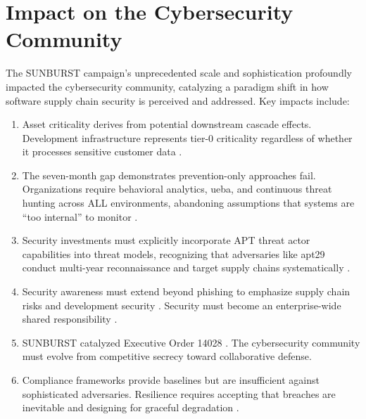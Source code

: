 \section{Impact on the Cybersecurity Community}

The SUNBURST campaign's unprecedented scale and sophistication profoundly impacted the cybersecurity community, catalyzing a paradigm shift in how software supply chain security is perceived and addressed. Key impacts include:

\begin{enumerate}
    \item {} Asset criticality derives from potential downstream cascade effects. Development infrastructure represents tier-0 criticality regardless of whether it processes sensitive customer data \cite{boyens2024}.
    \item {} The seven-month gap demonstrates prevention-only approaches fail. Organizations require behavioral analytics, \gls{ueba}, and continuous threat hunting across ALL environments, abandoning assumptions that systems are ``too internal'' to monitor \cite{nelson2025}.
    \item {} Security investments must explicitly incorporate APT threat actor capabilities into threat models, recognizing that adversaries like \gls{apt}29 conduct multi-year reconnaissance and target supply chains systematically \cite{mitre2025a}.
    \item {} Security awareness must extend beyond phishing to emphasize supply chain risks and development security \cite{boyens2024}. Security must become an enterprise-wide shared responsibility \cite{pascoe2024}.
    \item {} SUNBURST catalyzed Executive Order 14028 \cite{biden2021}. The cybersecurity community must evolve from competitive secrecy toward collaborative defense.
    \item {} Compliance frameworks provide baselines but are insufficient against sophisticated adversaries. Resilience requires accepting that breaches are inevitable and designing for graceful degradation \cite{nelson2025}.
\end{enumerate}
